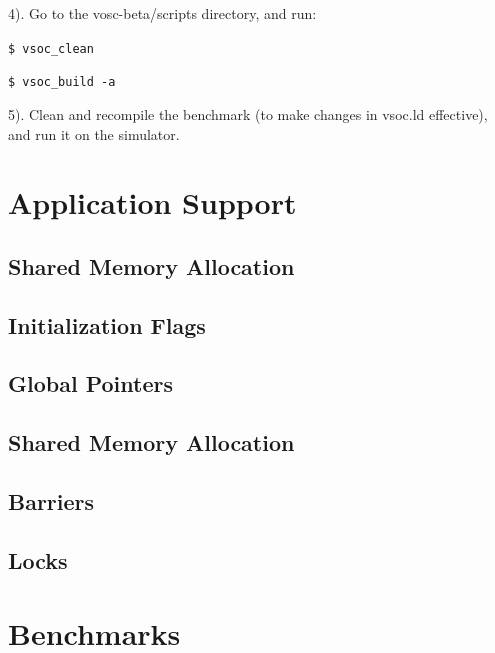 \documentclass{article}
\begin{document}
\vspace{2mm}
4). Go to the vosc-beta/scripts directory, and run:

{
\addtolength{\leftskip}{6mm}

\hspace{5mm}\texttt{\$ vsoc\_clean}

\hspace{5mm}\texttt{\$ vsoc\_build -a}

}

\vspace{2mm}
5). Clean and recompile the benchmark (to make changes in vsoc.ld effective), and run it on the simulator.

\newpage

\section{Application Support}

\subsection{Shared Memory Allocation}
\subsection{Initialization Flags}
\subsection{Global Pointers}
\subsection{Shared Memory Allocation}
\subsection{Barriers}
\subsection{Locks}

\newpage
\section{Benchmarks}
\end{document}
